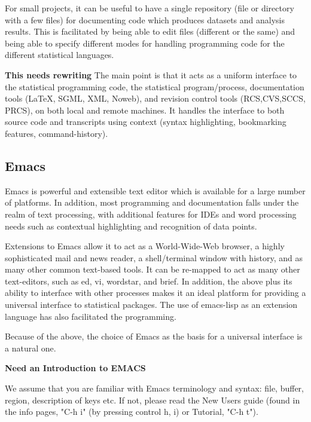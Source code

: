 \documentclass{article}
\begin{document}
For small projects, it can be useful to have a single repository (file
or directory with a few files) for documenting code which produces
datasets and analysis results.  This is facilitated by being able to
edit files (different or the same) and being able to specify different
modes for handling programming code for the different statistical
languages.

\textbf{This needs rewriting} The main point is that it acts as a
uniform interface to the statistical programming code, the statistical
program/process, documentation tools (\LaTeX, SGML, XML, Noweb), and
revision control tools (RCS,CVS,SCCS, PRCS), on both local and remote
machines.  It handles the interface to both source code and
transcripts using context (syntax highlighting, bookmarking features,
command-history).

\subsection{Emacs}
\label{sec:intro:emacs}

Emacs is powerful and extensible text editor which is
available for a large number of platforms.  In addition, most
programming and documentation falls under the realm of text
processing, with additional features for IDEs and word processing
needs such as contextual highlighting and recognition of data points.

Extensions to Emacs allow it to act as a World-Wide-Web browser, a
highly sophisticated mail and news reader, a shell/terminal window
with history, and as many other common text-based tools.  It can be
re-mapped to act as many other text-editors, such as ed, vi, wordstar,
and brief.  In addition, the above plus its ability to interface with
other processes makes it an ideal platform for providing a universal
interface to statistical packages.  The use of emacs-lisp as an
extension language has also facilitated the programming.

Because of the above, the choice of Emacs as the basis for a universal
interface is a natural one.  

\textbf{Need an Introduction to EMACS}

We assume that you are familiar with Emacs terminology and syntax:
file, buffer, region, description of keys etc.  If not, please read
the New Users guide (found in the info pages, "C-h i" (by pressing
control h, i) or Tutorial, "C-h t").
\end{document}
